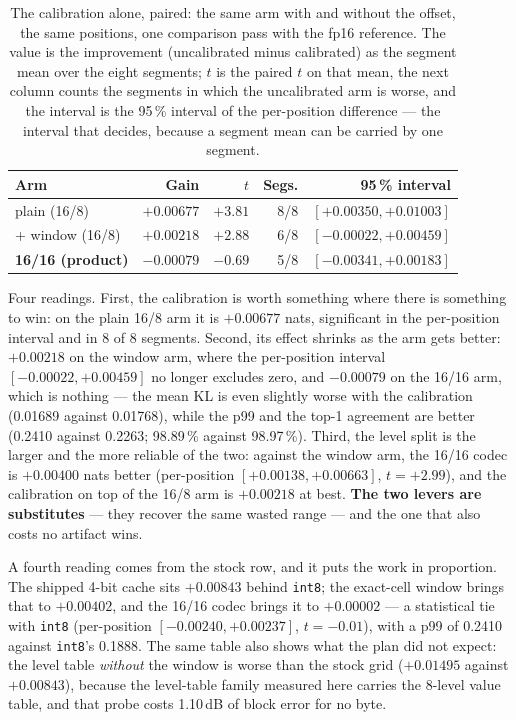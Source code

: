 \documentclass[10pt,twocolumn]{article}
\begin{document}
\begin{table}[t]
\centering
\footnotesize
\caption{The calibration alone, paired: the same arm with and without the offset, the same positions, one comparison pass with the fp16 reference. The value is the improvement (uncalibrated minus calibrated) as the segment mean over the eight segments; $t$ is the paired $t$ on that mean, the next column counts the segments in which the uncalibrated arm is worse, and the interval is the 95\,\% interval of the per-position difference --- the interval that decides, because a segment mean can be carried by one segment.}
\label{tab:center-effect}
\begin{tabular}{@{}lrrrr@{}}
\toprule
Arm & Gain & $t$ & Segs. & 95\,\% interval \\
\midrule
plain (16/8) & $+0.00677$ & $+3.81$ & 8/8 & $[+0.00350, +0.01003]$ \\
+ window (16/8) & $+0.00218$ & $+2.88$ & 6/8 & $[-0.00022, +0.00459]$ \\
\textbf{16/16 (product)} & $-0.00079$ & $-0.69$ & 5/8 & $[-0.00341, +0.00183]$ \\
\bottomrule
\end{tabular}
\end{table}

Four readings. First, the calibration is worth something where there is something to win: on the plain 16/8 arm it is $+0.00677$ nats, significant in the per-position interval and in 8 of 8 segments. Second, its effect shrinks as the arm gets better: $+0.00218$ on the window arm, where the per-position interval $[-0.00022, +0.00459]$ no longer excludes zero, and $-0.00079$ on the 16/16 arm, which is nothing --- the mean KL is even slightly worse with the calibration (0.01689 against 0.01768), while the p99 and the top-1 agreement are better (0.2410 against 0.2263; 98.89\,\% against 98.97\,\%). Third, the level split is the larger and the more reliable of the two: against the window arm, the 16/16 codec is $+0.00400$ nats better (per-position $[+0.00138, +0.00663]$, $t = +2.99$), and the calibration on top of the 16/8 arm is $+0.00218$ at best. \textbf{The two levers are substitutes} --- they recover the same wasted range --- and the one that also costs no artifact wins.

A fourth reading comes from the stock row, and it puts the work in proportion. The shipped 4-bit cache sits $+0.00843$ behind \texttt{int8}; the exact-cell window brings that to $+0.00402$, and the 16/16 codec brings it to $+0.00002$ --- a statistical tie with \texttt{int8} (per-position $[-0.00240, +0.00237]$, $t = -0.01$), with a p99 of 0.2410 against \texttt{int8}'s 0.1888. The same table also shows what the plan did not expect: the level table \emph{without} the window is worse than the stock grid ($+0.01495$ against $+0.00843$), because the level-table family measured here carries the 8-level value table, and that probe costs 1.10\,dB of block error for no byte.
\end{document}
